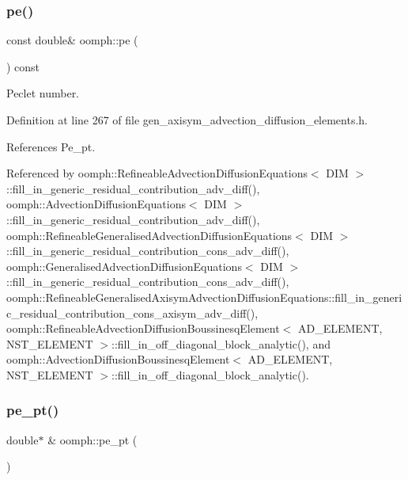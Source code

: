 \mbox{\label{namespaceoomph_afc45e5b8613b10bb546b3400a996d8a2}} 
\subsubsection{\texorpdfstring{pe()}{pe()}}
{\footnotesize\ttfamily const double\& oomph\+::pe (\begin{DoxyParamCaption}{ }\end{DoxyParamCaption}) const}



Peclet number. 



Definition at line 267 of file gen\+\_\+axisym\+\_\+advection\+\_\+diffusion\+\_\+elements.\+h.



References Pe\+\_\+pt.



Referenced by oomph\+::\+Refineable\+Advection\+Diffusion\+Equations$<$ D\+I\+M $>$\+::fill\+\_\+in\+\_\+generic\+\_\+residual\+\_\+contribution\+\_\+adv\+\_\+diff(), oomph\+::\+Advection\+Diffusion\+Equations$<$ D\+I\+M $>$\+::fill\+\_\+in\+\_\+generic\+\_\+residual\+\_\+contribution\+\_\+adv\+\_\+diff(), oomph\+::\+Refineable\+Generalised\+Advection\+Diffusion\+Equations$<$ D\+I\+M $>$\+::fill\+\_\+in\+\_\+generic\+\_\+residual\+\_\+contribution\+\_\+cons\+\_\+adv\+\_\+diff(), oomph\+::\+Generalised\+Advection\+Diffusion\+Equations$<$ D\+I\+M $>$\+::fill\+\_\+in\+\_\+generic\+\_\+residual\+\_\+contribution\+\_\+cons\+\_\+adv\+\_\+diff(), oomph\+::\+Refineable\+Generalised\+Axisym\+Advection\+Diffusion\+Equations\+::fill\+\_\+in\+\_\+generic\+\_\+residual\+\_\+contribution\+\_\+cons\+\_\+axisym\+\_\+adv\+\_\+diff(), oomph\+::\+Refineable\+Advection\+Diffusion\+Boussinesq\+Element$<$ A\+D\+\_\+\+E\+L\+E\+M\+E\+N\+T, N\+S\+T\+\_\+\+E\+L\+E\+M\+E\+N\+T $>$\+::fill\+\_\+in\+\_\+off\+\_\+diagonal\+\_\+block\+\_\+analytic(), and oomph\+::\+Advection\+Diffusion\+Boussinesq\+Element$<$ A\+D\+\_\+\+E\+L\+E\+M\+E\+N\+T, N\+S\+T\+\_\+\+E\+L\+E\+M\+E\+N\+T $>$\+::fill\+\_\+in\+\_\+off\+\_\+diagonal\+\_\+block\+\_\+analytic().

\mbox{\label{namespaceoomph_a92163fa29e433b796a345137e525b3af}} 
\subsubsection{\texorpdfstring{pe\+\_\+pt()}{pe\_pt()}}
{\footnotesize\ttfamily double$\ast$ \& oomph\+::pe\+\_\+pt (\begin{DoxyParamCaption}{ }\end{DoxyParamCaption})}



